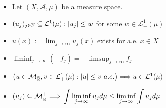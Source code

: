 \begin{minipage}[t]{0.46\textwidth}
\begin{given}
\begin{itemize}
\item  Let \((X,\mathcal{A},\mu )\) be a measure space.
  \item \((u_{j})_{j\in \Bbb{N}}\subseteq \mathcal{L}^1(\mu ): |u_{j}|\leq w\) for some \(w\in \mathcal{L}_{+}^1(\mu )\)
  \item \(u(x):=\lim_{j\rightarrow \infty }u_{j}(x)\) exists for a.e. \(x\in X\)
\end{itemize}
\end{given}

\begin{tools}
\begin{itemize}
\item \(\displaystyle
\liminf_{j\rightarrow \infty } (-f_{j}) = -\limsup_{j\rightarrow \infty } f_{j}
\)\\
\item \(
\big(u\in \mathcal{M}_{\bar{\Bbb{R}}},v\in \mathcal{L}_{+}^1(\mu ): |u|\leq v\  a.e.\big) \\ \Longrightarrow u\in \mathcal{L}^1(\mu )
\)\\
\item \(\displaystyle
(u_{j})\subseteq \mathcal{M}_{\bar{\Bbb{R}}}^+  \Longrightarrow  \\\int  \liminf_{j\rightarrow \infty } u_{j} d\mu \leq  \liminf_{j\rightarrow \infty }\int u_{j} d\mu 
\)

\end{itemize}
\end{tools}

\end{minipage}
